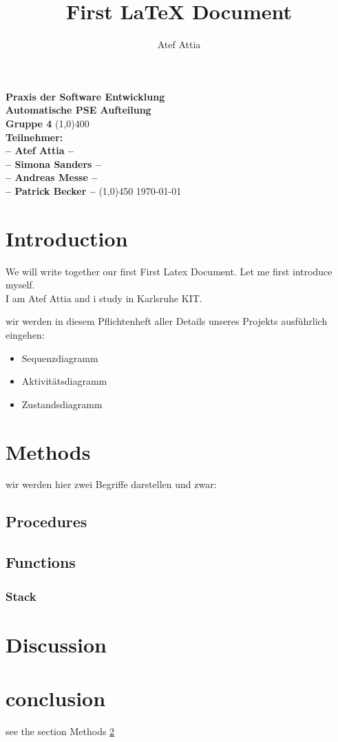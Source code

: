 \documentclass[parskip=full]{scrartcl}
\title{First LaTeX Document}
\author{Atef Attia}
\begin{document}
\begin{titlepage}
\begin{center}
\vspace*{1cm}
\Huge{\textbf{Praxis der Software Entwicklung\\ Automatische PSE Aufteilung\\ Gruppe 4}}
\vfill
\line(1,0){400}\\[2mm]
\huge{\textbf{Teilnehmer: }}\\
\Large{\textbf{-- Atef Attia --}}\\
\Large{\textbf{-- Simona Sanders --}}\\
\Large{\textbf{-- Andreas Messe --}}\\
\Large{\textbf{-- Patrick Becker --}}
\line(1,0){450}
\vfill
\today
\end{center}
\end{titlepage}


\section{Introduction}
\begin{large}
We will write together our first First Latex Document. Let me first introduce myself.\\
I am Atef Attia and i study in Karlsruhe KIT.

wir werden in diesem Pflichtenheft aller Details unseres Projekts ausführlich eingehen:
\begin{itemize}
\item Sequenzdiagramm
\item Aktivitätsdiagramm
\item Zustandsdiagramm
\end{itemize}
\end{large}
\section{Methods}\label{sec:method}
\begin{large}
wir werden hier zwei Begriffe darstellen und zwar:\\
\end{large}
\subsection{Procedures}

\subsection{Functions}
\subsubsection {Stack}

\section{Discussion}


\section{conclusion}
see the section Methods \ref{sec:method}
\end{document}
